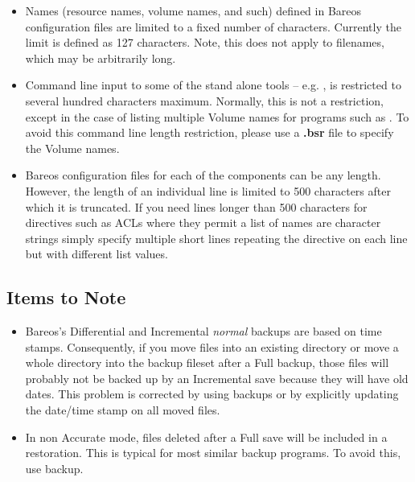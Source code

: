 \begin{itemize}
\item Names (resource names, volume names, and such) defined in Bareos
   configuration files are limited to a fixed number of
   characters.  Currently the limit is defined as 127 characters.  Note,
   this does not apply to filenames, which may be arbitrarily long.
\item Command line input to some of the stand alone tools -- e.g. ,
    is restricted to several hundred characters maximum.
   Normally, this is not a restriction, except in the case of listing
   multiple Volume names for programs such as . To avoid
   this command line length restriction, please use a {\bf .bsr}
   file to specify the Volume names.
\item Bareos configuration files for each of the components can be
   any length. However, the length of an individual line is limited
   to 500 characters after which it is truncated.  If you need lines
   longer than 500 characters for directives such as ACLs where
   they permit a list of names are character strings simply
   specify multiple short lines repeating the directive on
   each line but with different list values.
\end{itemize}

\subsection{Items to Note}
\begin{itemize}
\item Bareos's Differential and Incremental \textsl{normal} backups are based
  on time stamps.  Consequently, if you move files into an existing directory
  or move a whole directory into the backup fileset after a Full backup, those
  files will probably not be backed up by an Incremental save because they will
  have old dates.  This problem is corrected by using  backups
  or by explicitly updating the date/time stamp on all moved files.
\item In non Accurate mode, files deleted after a Full save will be
  included in a restoration. This is typical for most similar backup programs.
  To avoid this, use  backup.
\end{itemize}
